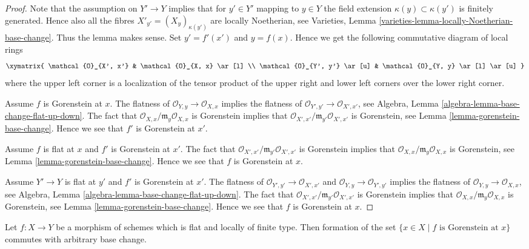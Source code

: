 \begin{proof}
Note that the assumption on $Y' \to Y$ implies that for $y' \in Y'$
mapping to $y \in Y$ the field extension $\kappa(y) \subset \kappa(y')$
is finitely generated. Hence also all the fibres
$X'_{y'} = (X_y)_{\kappa(y')}$ are locally Noetherian, see
Varieties, Lemma \ref{varieties-lemma-locally-Noetherian-base-change}.
Thus the lemma makes sense. Set $y' = f'(x')$ and $y = f(x)$.
Hence we get the following commutative diagram of local rings
$$
\xymatrix{
\mathcal{O}_{X', x'} & \mathcal{O}_{X, x} \ar[l] \\
\mathcal{O}_{Y', y'} \ar[u] & \mathcal{O}_{Y, y} \ar[l] \ar[u]
}
$$
where the upper left corner is a localization of the tensor product
of the upper right and lower left corners over the lower right corner.

\medskip\noindent
Assume $f$ is Gorenstein at $x$.
The flatness of $\mathcal{O}_{Y, y} \to \mathcal{O}_{X, x}$
implies the flatness of $\mathcal{O}_{Y', y'} \to \mathcal{O}_{X', x'}$, see
Algebra, Lemma \ref{algebra-lemma-base-change-flat-up-down}.
The fact that $\mathcal{O}_{X, x}/\mathfrak m_y\mathcal{O}_{X, x}$
is Gorenstein implies that
$\mathcal{O}_{X', x'}/\mathfrak m_{y'}\mathcal{O}_{X', x'}$
is Gorenstein, see
Lemma \ref{lemma-gorenstein-base-change}. Hence we see that $f'$
is Gorenstein at $x'$.

\medskip\noindent
Assume $f$ is flat at $x$ and $f'$ is Gorenstein at $x'$.
The fact that $\mathcal{O}_{X', x'}/\mathfrak m_{y'}\mathcal{O}_{X', x'}$
is Gorenstein implies that
$\mathcal{O}_{X, x}/\mathfrak m_y\mathcal{O}_{X, x}$
is Gorenstein, see
Lemma \ref{lemma-gorenstein-base-change}. Hence we see that $f$
is Gorenstein at $x$.

\medskip\noindent
Assume $Y' \to Y$ is flat at $y'$ and $f'$ is Gorenstein at
$x'$. The flatness of $\mathcal{O}_{Y', y'} \to \mathcal{O}_{X', x'}$
and $\mathcal{O}_{Y, y} \to \mathcal{O}_{Y', y'}$ implies the flatness
of $\mathcal{O}_{Y, y} \to \mathcal{O}_{X, x}$, see
Algebra, Lemma \ref{algebra-lemma-base-change-flat-up-down}.
The fact that $\mathcal{O}_{X', x'}/\mathfrak m_{y'}\mathcal{O}_{X', x'}$
is Gorenstein implies that
$\mathcal{O}_{X, x}/\mathfrak m_y\mathcal{O}_{X, x}$
is Gorenstein, see
Lemma \ref{lemma-gorenstein-base-change}. Hence we see that $f$
is Gorenstein at $x$.
\end{proof}

\begin{lemma}
\label{lemma-flat-lft-base-change-gorenstein}
Let $f : X \to Y$ be a morphism of schemes which is flat and
locally of finite type. Then formation of the set
$\{x \in X \mid f\text{ is Gorenstein at }x\}$
commutes with arbitrary base change.
\end{lemma}

